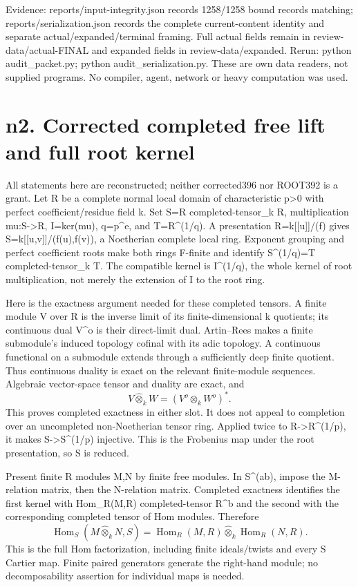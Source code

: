 \documentclass[11pt]{article}
\begin{document}
Evidence: reports/input-integrity.json records 1258/1258 bound records matching; reports/serialization.json records the complete current-content identity and separate actual/expanded/terminal framing. Full actual fields remain in review-data/actual-FINAL and expanded fields in review-data/expanded. Rerun: python audit\_packet.py; python audit\_serialization.py. These are own data readers, not supplied programs. No compiler, agent, network or heavy computation was used.

\section{n2. Corrected completed free lift and full root kernel}

All statements here are reconstructed; neither corrected396 nor ROOT392 is a grant. Let R be a complete normal local domain of characteristic p>0 with perfect coefficient/residue field k. Set S=R completed-tensor\_k R, multiplication mu:S->R, I=ker(mu), q=p\textasciicircum{}e, and T=R\textasciicircum{}(1/q). A presentation R=k[[u]]/(f) gives S=k[[u,v]]/(f(u),f(v)), a Noetherian complete local ring. Exponent grouping and perfect coefficient roots make both rings F-finite and identify S\textasciicircum{}(1/q)=T completed-tensor\_k T. The compatible kernel is I\textasciicircum{}(1/q), the whole kernel of root multiplication, not merely the extension of I to the root ring.

Here is the exactness argument needed for these completed tensors. A finite module V over R is the inverse limit of its finite-dimensional k quotients; its continuous dual V\textasciicircum{}o is their direct-limit dual. Artin--Rees makes a finite submodule's induced topology cofinal with its adic topology. A continuous functional on a submodule extends through a sufficiently deep finite quotient. Thus continuous duality is exact on the relevant finite-module sequences. Algebraic vector-space tensor and duality are exact, and
\[
 V\widehat\otimes_k W=(V^o\otimes_k W^o)^*.
\]
This proves completed exactness in either slot. It does not appeal to completion over an uncompleted non-Noetherian tensor ring. Applied twice to R->R\textasciicircum{}(1/p), it makes S->S\textasciicircum{}(1/p) injective. This is the Frobenius map under the root presentation, so S is reduced.

Present finite R modules M,N by finite free modules. In S\textasciicircum{}(ab), impose the M-relation matrix, then the N-relation matrix. Completed exactness identifies the first kernel with Hom\_R(M,R) completed-tensor R\textasciicircum{}b and the second with the corresponding completed tensor of Hom modules. Therefore
\[
\operatorname{Hom}_S(M\widehat\otimes_k N,S)
=\operatorname{Hom}_R(M,R)\widehat\otimes_k\operatorname{Hom}_R(N,R).
\]
This is the full Hom factorization, including finite ideals/twists and every S Cartier map. Finite paired generators generate the right-hand module; no decomposability assertion for individual maps is needed.
\end{document}
